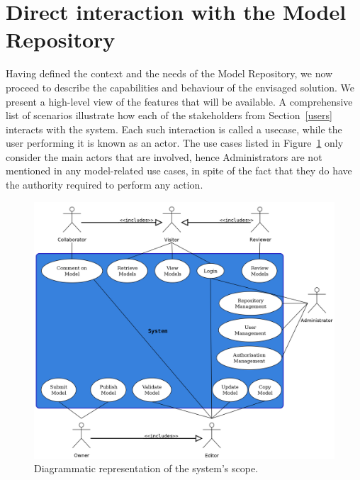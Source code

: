 \section{Direct interaction with the \ddmore Model Repository}
\label{directInteraction}
Having defined the context and the needs of the \ddmore Model Repository, we now proceed to describe the capabilities and behaviour of the envisaged solution. We present a high-level view of the features that will be available. A comprehensive list of scenarios illustrate how each of the stakeholders from Section~\ref{users} interacts with the system. Each such interaction is called a \gls{usecase}, while the user performing it is known as an \gls{actor}. The use cases listed in Figure~\ref{fig:useCases} only consider the main actors that are involved, hence Administrators are not mentioned in any model-related use cases, in spite of the fact that they do have the authority required to perform any action.

\begin{figure}[htb]
\centering
\includegraphics{img/UseCases}
\caption{Diagrammatic representation of the system's scope.}
\label{fig:useCases}
\end{figure}

